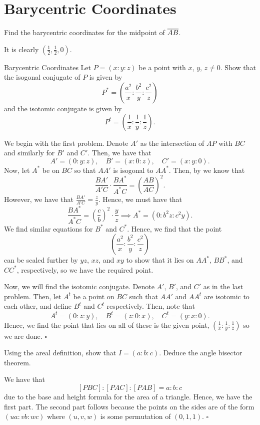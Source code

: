 \documentclass{article}
\begin{document}
\newpage

\section{Barycentric Coordinates}

\begin{problem}[7.5]{}
Find the barycentric coordinates for the midpoint of $\overline{AB}$.
\end{problem}
It is clearly $\boxed{\left(\tfrac{1}{2}, \tfrac{1}{2}, 0\right)}$.

\begin{problem}[7.6]{Barycentric Coordinates}
Let $P = (x : y : z)$ be a point with $x$, $y$, $z \neq 0$. Show that the isogonal conjugate of $P$ is given by \[P^* =	\left(\dfrac{a^2}{x}:\dfrac{b^2}{y}:\dfrac{c^2}{z}\right)\] and the isotomic conjugate is given by \[P^t = \left(\dfrac{1}{x}:\dfrac{1}{y}:\dfrac{1}{z}\right).\]
\end{problem}
We begin with the first problem. Denote $A'$ as the intersection of $AP$ with $BC$ and similarly for $B'$ and $C'$. Then, we have that \[A' = (0 : y : z), \quad B' = (x : 0 : z), \quad C' = (x : y : 0).\] Now, let $A^*$ be on $BC$ so that $AA'$ is isogonal to $AA^*$. Then, by  we know that \[\dfrac{BA'}{A'C}\cdot \dfrac{BA^*}{A^*C} = \left(\dfrac{AB}{AC}\right)^2.\] However, we have that $\tfrac{BA'}{A'C} = \tfrac{z}{y}$. Hence, we must have that \[\dfrac{BA^*}{A^*C} = \left(\dfrac{c}{b}\right)^2\cdot \dfrac{y}{z} \implies A^* = \left(0: b^2z: c^2y\right).\] We find similar equations for $B^*$ and $C^*$. Hence, we find that the point \[\left(\dfrac{a^2}{x}:\dfrac{b^2}{y}:\dfrac{c^2}{z}\right)\] can be scaled further by $yz$, $xz$, and $xy$ to show that it lies on $AA^*$, $BB^*$, and $CC^*$, respectively, so we have the required point.

Now, we will find the isotomic conjugate. Denote $A'$, $B'$, and $C'$ as in the last problem. Then, let $A^t$ be a point on $BC$ such that $AA'$ and $AA^t$ are isotomic to each other, and define $B^t$ and $C^t$ respectively. Then, note that \[A^t = (0 : z : y), \quad B^t = (z : 0 : x), \quad C^t = (y : x : 0).\] Hence, we find the point that lies on all of these is the given point, $\left(\tfrac{1}{x}:\tfrac{1}{y}:\tfrac{1}{z}\right)$ so we are done. $\square$

\newpage

\begin{problem}[7.8]{}
Using the areal definition, show that $I = (a : b : c)$. Deduce the angle bisector theorem.
\end{problem}
We have that \[[PBC] : [PAC] : [PAB] = a : b : c\] due to the base and height formula for the area of a triangle. Hence, we have the first part. The second part follows because the points on the sides are of the form $(ua : vb : wc)$ where $(u, v, w)$ is some permutation of $(0, 1, 1)$. $\square$
\end{document}

